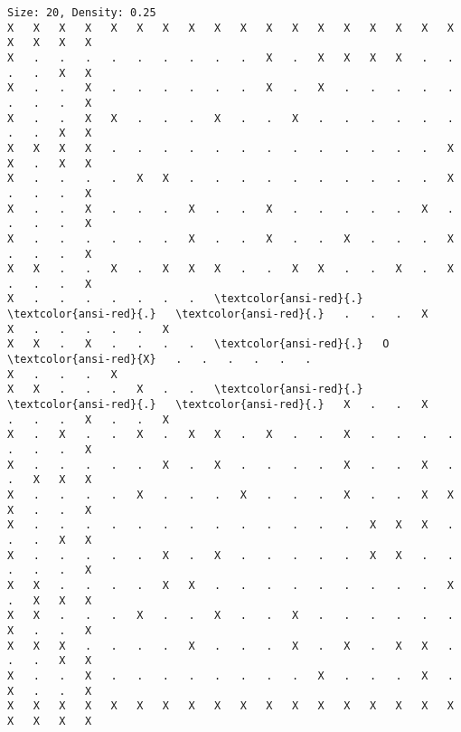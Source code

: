 \documentclass[11pt]{article}
\begin{document}
 \begin{Verbatim}[commandchars=\\\{\},fontsize=\footnotesize]
Size: 20, Density: 0.25
X   X   X   X   X   X   X   X   X   X   X   X   X   X   X   X   X   X   X   X   X   X
X   .   .   .   .   .   .   .   .   .   X   .   X   X   X   X   .   .   .   .   X   X
X   .   .   X   .   .   .   .   .   .   X   .   X   .   .   .   .   .   .   .   .   X
X   .   .   X   X   .   .   .   X   .   .   X   .   .   .   .   .   .   .   .   X   X
X   X   X   X   .   .   .   .   .   .   .   .   .   .   .   .   .   X   X   .   X   X
X   .   .   .   .   X   X   .   .   .   .   .   .   .   .   .   .   X   .   .   .   X
X   .   .   X   .   .   .   X   .   .   X   .   .   .   .   .   X   .   .   .   .   X
X   .   .   .   .   .   .   X   .   .   X   .   .   X   .   .   .   X   .   .   .   X
X   X   .   .   X   .   X   X   X   .   .   X   X   .   .   X   .   X   .   .   .   X
X   .   .   .   .   .   .   .   \textcolor{ansi-red}{.}   \textcolor{ansi-red}{.}   \textcolor{ansi-red}{.}   .   .   .   X
X   .   .   .   .   .   X
X   X   .   X   .   .   .   .   \textcolor{ansi-red}{.}   O   \textcolor{ansi-red}{X}   .   .   .   .   .   .
X   .   .   .   X
X   X   .   .   .   X   .   .   \textcolor{ansi-red}{.}   \textcolor{ansi-red}{.}   \textcolor{ansi-red}{.}   X   .   .   X
.   .   .   X   .   .   X
X   .   X   .   .   X   .   X   X   .   X   .   .   X   .   .   .   .   .   .   .   X
X   .   .   .   .   .   X   .   X   .   .   .   .   X   .   .   X   .   .   X   X   X
X   .   .   .   .   X   .   .   .   X   .   .   .   X   .   .   X   X   X   .   .   X
X   .   .   .   .   .   .   .   .   .   .   .   .   .   X   X   X   .   .   .   X   X
X   .   .   .   .   .   X   .   X   .   .   .   .   .   X   X   .   .   .   .   .   X
X   X   .   .   .   .   X   X   .   .   .   .   .   .   .   .   .   X   .   X   X   X
X   X   .   .   .   X   .   .   X   .   .   X   .   .   .   .   .   .   X   .   .   X
X   X   X   .   .   .   .   X   .   .   .   X   .   X   .   X   X   .   .   .   X   X
X   .   .   X   .   .   .   .   .   .   .   .   X   .   .   .   X   .   X   .   .   X
X   X   X   X   X   X   X   X   X   X   X   X   X   X   X   X   X   X   X   X   X   X


\end{Verbatim}
\end{document}
